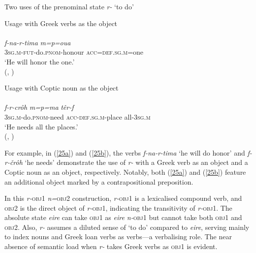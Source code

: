 \documentclass[output=paper,colorlinks,citecolor=brown ,chinesefont]{langscibook}
\begin{document}
\begin{exe}
    \ex Two uses of the prenominal state  \textit{r-} ‘to do'
    \begin{xlist}
        \ex\label{25a} Usage with Greek verbs as the object\\
        \glll \textbf{} 				  \\
        \textit{f-na-r-tima}	 		\textit{m=p=oua}	\\
        3\textsc{sg}.\textsc{m}-\textsc{fut}-do.\textsc{pnom}-honour 	\textsc{acc}=\textsc{def}.\textsc{sg}.\textsc{m}=one	\\
        \glt ‘He will honor the one.' \\
        \hspace*{\fill}(, \citealt{layton2})
        \clearpage

        \ex\label{25b} Usage with Coptic noun as the object \\
        \glll \textbf{} 		 			 \\
        \textit{f-r-crôh}	 		\textit{m=p=ma}		\textit{têr-f} \\
        3\textsc{sg}.\textsc{m}-do.\textsc{pnom}-need	\textsc{acc}-\textsc{def}.\textsc{sg}.\textsc{m}-place 	all-3\textsc{sg}.\textsc{m} \\
        \glt 	 ‘He needs all the places.' \\
        \hspace*{\fill}(, \citealt{layton2})
    \end{xlist}
\end{exe}

   For example, in (\ref{25a}) and (\ref{25b}), the verbs  \textit{f-na-r-tima} ‘he will do honor' and  \textit{f-r-črôh} ‘he needs' demonstrate the use of  \textit{r-} with a Greek verb as an object and a Coptic noun as an object, respectively. Notably, both (\ref{25a}) and (\ref{25b}) feature an additional object marked by a contrapositional preposition.
   
   
   In this \textit{r-}\textsc{obj}1 \textit{n=}\textsc{obj}2 construction, \textit{r-}\textsc{obj}1 is a lexicalised compound verb, and \textsc{obj}2 is the direct object of \textit{r-}\textsc{obj}1, indicating the transitivity of \textit{r-}\textsc{obj}1. The absolute state  \textit{eire} can take \textsc{obj}1 as \textit{eire n-}\textsc{obj}1 but cannot take both \textsc{obj}1 and \textsc{obj}2. Also,  \textit{r-} assumes a diluted sense of ‘to do' compared to  \textit{eire}, serving mainly to index nouns and Greek loan verbs as verbs---a verbalising role. The near absence of semantic load when  \textit{r-} takes Greek verbs as \textsc{obj}1 is evident.
   
\end{document}
